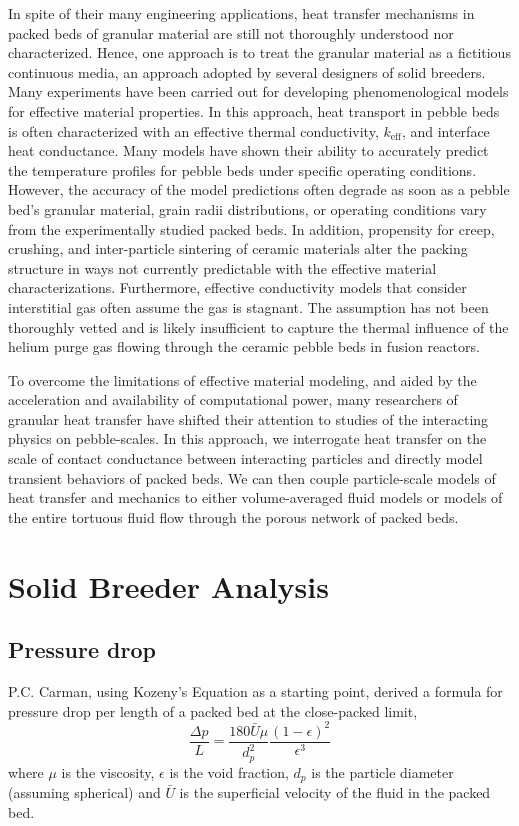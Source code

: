 \documentclass[11pt]{report} %
\begin{document}
In spite of their many engineering applications, heat transfer mechanisms in packed beds of granular material are still not thoroughly understood nor characterized. Hence, one approach is to treat the granular material as a fictitious continuous media, an approach adopted by several designers of solid breeders. Many experiments have been carried out for developing phenomenological models for effective material properties. In this approach, heat transport in pebble beds is often characterized with an effective thermal conductivity, $k_\text{eff}$, and interface heat conductance. Many models have shown their ability to accurately predict the temperature profiles for pebble beds under specific operating conditions. However, the accuracy of the model predictions often degrade as soon as a pebble bed's granular material, grain radii distributions, or operating conditions vary from the experimentally studied packed beds. In addition, propensity for creep, crushing, and inter-particle sintering of ceramic materials alter the packing structure in ways not currently predictable with the effective material characterizations. Furthermore, effective conductivity models that consider interstitial gas often assume the gas is stagnant. The assumption has not been thoroughly vetted and is likely insufficient to capture the thermal influence of the helium purge gas flowing through the ceramic pebble beds in fusion reactors.

To overcome the limitations of effective material modeling, and aided by the acceleration and availability of computational power, many researchers of granular heat transfer have shifted their attention to studies of the interacting physics on pebble-scales. In this approach, we interrogate heat transfer on the scale of contact conductance between interacting particles and directly model transient behaviors of packed beds. We can then couple particle-scale models of heat transfer and mechanics to either volume-averaged fluid models or models of the entire tortuous fluid flow through the porous network of packed beds.






\chapter{Solid Breeder Analysis}

\section{Pressure drop}
P.C. Carman\cite{Carman1997}, using Kozeny's Equation as a starting point, derived a formula for pressure drop per length of a packed bed at the close-packed limit,
\begin{equation}\label{eq:K-C-pressure}
    \frac{\Delta p}{L} = \frac{180 \bar{U} \mu}{d_p^2} \frac{(1-\epsilon)^2}{\epsilon^3}
\end{equation}
where $\mu$ is the viscosity, $\epsilon$ is the void fraction, $d_p$ is the particle diameter (assuming spherical) and $\bar{U}$ is the superficial velocity of the fluid in the packed bed.
\end{document}

